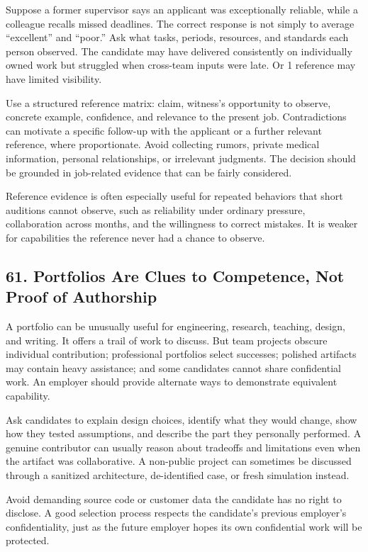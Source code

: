 Suppose a former supervisor says an applicant was exceptionally reliable, while a colleague recalls missed deadlines. The correct response is not simply to average ``excellent'' and ``poor.'' Ask what tasks, periods, resources, and standards each person observed. The candidate may have delivered consistently on individually owned work but struggled when cross-team inputs were late. Or 1 reference may have limited visibility.

Use a structured reference matrix: claim, witness's opportunity to observe, concrete example, confidence, and relevance to the present job. Contradictions can motivate a specific follow-up with the applicant or a further relevant reference, where proportionate. Avoid collecting rumors, private medical information, personal relationships, or irrelevant judgments. The decision should be grounded in job-related evidence that can be fairly considered.

Reference evidence is often especially useful for repeated behaviors that short auditions cannot observe, such as reliability under ordinary pressure, collaboration across months, and the willingness to correct mistakes. It is weaker for capabilities the reference never had a chance to observe.

\subsection*{61. Portfolios Are Clues to Competence, Not Proof of Authorship}

A portfolio can be unusually useful for engineering, research, teaching, design, and writing. It offers a trail of work to discuss. But team projects obscure individual contribution; professional portfolios select successes; polished artifacts may contain heavy assistance; and some candidates cannot share confidential work. An employer should provide alternate ways to demonstrate equivalent capability.

Ask candidates to explain design choices, identify what they would change, show how they tested assumptions, and describe the part they personally performed. A genuine contributor can usually reason about tradeoffs and limitations even when the artifact was collaborative. A non-public project can sometimes be discussed through a sanitized architecture, de-identified case, or fresh simulation instead.

Avoid demanding source code or customer data the candidate has no right to disclose. A good selection process respects the candidate's previous employer's confidentiality, just as the future employer hopes its own confidential work will be protected.

